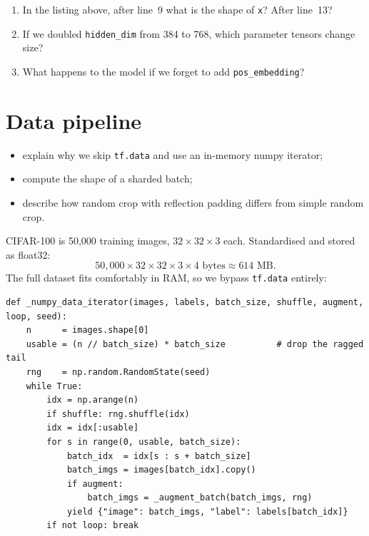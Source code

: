 \documentclass[11pt,a4paper]{article}
\newcounter{lab}
\newcommand{\answerspace}[1][3]{\vspace{#1\baselineskip}}
\begin{document}
\begin{checkpoint}
\begin{enumerate}[leftmargin=*]
\item In the listing above, after line~9 what is the shape of \texttt{x}? After line~13?
\item If we doubled \texttt{hidden\_dim} from 384 to 768, which parameter tensors change size?
\item What happens to the model if we forget to add \texttt{pos\_embedding}?
\end{enumerate}
\answerspace[4]
\end{checkpoint}

\section{Data pipeline}

\begin{objectives}
\begin{itemize}[leftmargin=*, itemsep=1pt]
    \item explain why we skip \texttt{tf.data} and use an in-memory numpy iterator;
    \item compute the shape of a sharded batch;
    \item describe how random crop with reflection padding differs from simple random crop.
\end{itemize}
\end{objectives}

CIFAR-100 is 50{,}000 training images, $32 \times 32 \times 3$ each. Standardised and stored
as float32:
$$50{,}000 \times 32 \times 32 \times 3 \times 4 \text{ bytes} \approx 614 \text{ MB}.$$
The full dataset fits comfortably in RAM, so we bypass \texttt{tf.data} entirely:

\begin{lstlisting}[style=py]
def _numpy_data_iterator(images, labels, batch_size, shuffle, augment, loop, seed):
    n      = images.shape[0]
    usable = (n // batch_size) * batch_size          # drop the ragged tail
    rng    = np.random.RandomState(seed)
    while True:
        idx = np.arange(n)
        if shuffle: rng.shuffle(idx)
        idx = idx[:usable]
        for s in range(0, usable, batch_size):
            batch_idx  = idx[s : s + batch_size]
            batch_imgs = images[batch_idx].copy()
            if augment:
                batch_imgs = _augment_batch(batch_imgs, rng)
            yield {"image": batch_imgs, "label": labels[batch_idx]}
        if not loop: break
\end{lstlisting}
\end{document}
